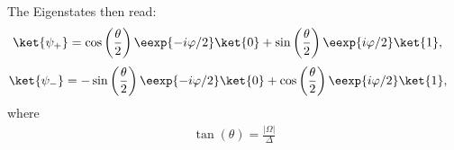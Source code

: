 The Eigenstates then read:
\begin{align}
				\ket{\psi_+}&=\cos\left(\frac{\theta}{2}\right) \eexp{-i{\varphi}/{2}}\ket{0}+\sin\left(\frac{\theta}{2}\right) \eexp{i{\varphi}/{2}}\ket{1}, \label{eq:staticpsiplus}
\end{align}
\begin{align}
				\ket{\psi_-}&=-\sin\left(\frac{\theta}{2}\right) \eexp{-i{\varphi}/{2}}\ket{0}+\cos\left(\frac{\theta}{2}\right) \eexp{i{\varphi}/{2}}\ket{1}, \label{eq:staticpsiminus}
\end{align}
where 
\begin{align} \label{eq:parameters}
	\tan(\theta) = \frac{|\Omega|}{\Delta} 
\end{align}